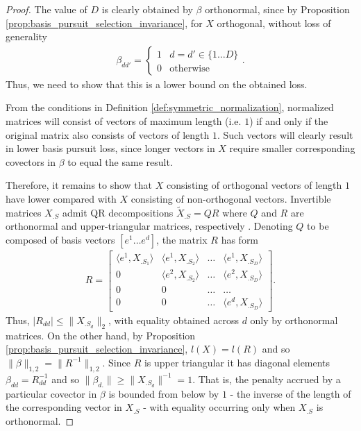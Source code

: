  \begin{proof}

The value of $D$ is clearly obtained by $\beta$ orthonormal, since by Proposition \ref{prop:basis_pursuit_selection_invariance}, for $X$ orthogonal, without loss of generality 
\begin{align}
\beta_{dd'} = \begin{cases} 1 & d = d' \in \{ 1 \dots D\}  \\
0 & \text{otherwise}
\end{cases}.
\end{align}
Thus, we need to show that this is a lower bound on the obtained loss.

From the conditions in Definition \ref{def:symmetric_normalization}, normalized matrices will consist of vectors of maximum length (i.e. $1$) if and only if the original matrix also consists of vectors of length $1$.
Such vectors will clearly result in lower basis pursuit loss, since longer vectors in $X$ require smaller corresponding covectors in $\beta$ to equal the same result.

Therefore, it remains to show that $X$ consisting of orthogonal vectors of length $1$ have lower compared with $X$ consisting of non-orthogonal vectors.
Invertible matrices $X_{.S}$ admit QR decompositions $\tilde X_{.S} = QR$ where $Q$ and $R$ are orthonormal and upper-triangular matrices, respectively \citep{Anderson1992-fb}.
Denoting $Q$ to be composed of basis vectors $[e^1 \dots e^d]$, the matrix $R$ has form
\begin{align}
R = \begin{bmatrix}
\langle e^1, X_{.S_1} \rangle & \langle e^1,  X_{.S_2} \rangle  &\dots &  \langle e^1,  X_{.S_D} \rangle \\
0 & \langle e^2,  X_{.S_2} \rangle & \dots  &  \langle e^2,  X_{.S_D} \rangle\\
0 & 0 & \dots & \dots  \\
0 & 0 & \dots & \langle e^d, X_{.S_D} \rangle 
\end{bmatrix}.
\end{align}
Thus, $|R_{dd} | \leq \|X_{.{S_{d}}}\|_2$, with equality obtained across $d$ only by orthonormal matrices.
On the other hand, by Proposition \ref{prop:basis_pursuit_selection_invariance}, $l(X) = l(R)$ and so $\|\beta\|_{1,2} = \|R^{-1}\|_{1,2}$.
Since $R$ is upper triangular it has diagonal elements $\beta_{dd} = R_{dd}^{-1}$ and so $\|\beta_{d.}\| \geq \| X_{.{S_d}}\|^{-1} = 1$.
That is, the penalty accrued by a particular covector in $\beta$ is bounded from below by $1$ - the inverse of the length of the corresponding vector in $X_{.S}$ - with equality occurring only when $X_{.S}$ is orthonormal.


\end{proof}
